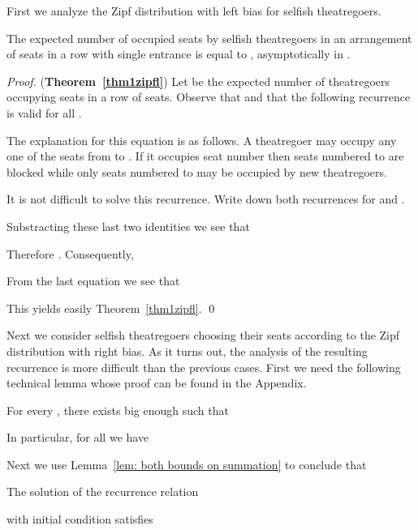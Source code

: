 \documentclass[11pt]{llncs}
\begin{document}
First we analyze the Zipf distribution 
with left bias for selfish theatregoers. 

\begin{theorem}
\label{thm1zipfl}
The expected number of occupied seats by selfish theatregoers
in an arrangement of  seats
in a row with single entrance is equal to , asymptotically in .
\end{theorem}
\begin{proof} ({\bf Theorem~\ref{thm1zipfl}})
Let  be the expected number of theatregoers occupying seats 
in a row of  seats.
Observe that  and that the following recurrence is valid
for all .

The explanation for this equation is as follows. A theatregoer
may occupy any one of the seats from  to . If it
occupies seat number  then seats numbered  to 
are blocked while only seats numbered  to  may be
occupied by new theatregoers. 

It is not difficult to solve this recurrence. Write down
both recurrences for  and .

Substracting these last two identities we see that

Therefore .
Consequently,

From the last equation we see that

This yields easily Theorem~\ref{thm1zipfl}.
\qed
\end{proof}



Next we consider  selfish theatregoers choosing their seats according to 
the Zipf distribution 
with right bias. As it turns out, the analysis of the resulting recurrence is
more difficult than the previous cases. First we need the following technical lemma whose proof can be found in the Appendix.
\begin{lemma}\label{lem: both bounds on summation}
For every , there exists  big enough such that

In particular, for all  we have 

\end{lemma}
Next we use Lemma~\ref{lem: both bounds on summation} to conclude that
\begin{lemma}
\label{costis2}
The solution of the recurrence relation 

with initial condition  satisfies 
\end{lemma}
\end{document}
